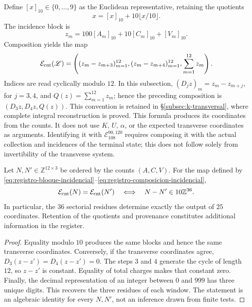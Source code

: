Define \([x]_{10}\in\{0,\ldots,9\}\) as the Euclidean
representative, retaining the quotients
\[
 x=[x]_{10}+10\lfloor x/10\rfloor.
\]
The incidence block is
\begin{equation}
 z_m=100[A_m]_{10}+10[C_m]_{10}+[V_m]_{10}.
 \label{eq:registro-bloque-incidencial}
\end{equation}
Composition yields the map
\begin{equation}
 \mathcal E_{\rm cnt}(\mathscr L)=
 \left((z_m-z_{m+3})_{m=1}^{12},
       (z_m-z_{m+4})_{m=1}^{12},\sum_{m=1}^{12}z_m\right).
\label{eq:registro-composicion-incidencial}
\end{equation}
Indices are read cyclically modulo \(12\). In this subsection,
\((D_jz)_m=z_m-z_{m+j}\), for \(j=3,4\), and
\(Q(z)=\sum_{m=1}^{12}z_m\); hence the preceding composition is
\((D_3z,D_4z,Q(z))\). This convention is retained in
\S\ref{subsec:k-transversal}, where complete integral
reconstruction is proved.
This formula produces its coordinates from the counts. It does not use
\(K\), \(U\), \(\alpha\), or the expected transverse coordinates
as arguments. Identifying it with
\(\mathcal E_{108}^{90,120}\) requires composing it with the actual collection and
incidences of the terminal state; this does not follow solely
from invertibility of the transverse system.

\begin{proposition}
\label{prop:registro-36-residuos}
Let \(N,N'\in\mathbb Z^{12\times3}\) be ordered by the counts
\((A,C,V)\). For the map defined by
\eqref{eq:registro-bloque-incidencial}--\eqref{eq:registro-composicion-incidencial},
\[
 \mathcal E_{\rm cnt}(N)=\mathcal E_{\rm cnt}(N')
 \quad\Longleftrightarrow\quad
 N-N'\in10\mathbb Z^{36}.
\]
In particular, the \(36\) sectorial residues determine exactly
the output of \(25\) coordinates. Retention of the quotients and
provenance constitutes additional information in the register.
\end{proposition}

\begin{proof}
Equality modulo \(10\) produces the same blocks and hence
the same transverse coordinates. Conversely, if the transverse
coordinates agree, \(D_3(z-z')=D_4(z-z')=0\). The steps
\(3\) and \(4\) generate the cycle of length \(12\), so
\(z-z'\) is constant. Equality of total charges makes that
constant zero. Finally, the decimal representation of an integer between
\(0\) and \(999\) has three unique digits. This recovers the
three residues of each window. The statement is an algebraic identity
for every \(N,N'\), not an inference drawn from finite tests.
\end{proof}

